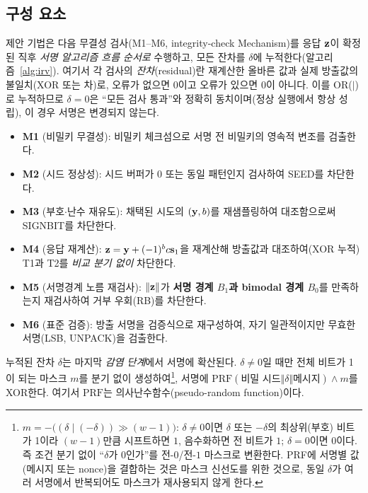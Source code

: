 \subsection{구성 요소}
제안 기법은 다음 무결성 검사(M1--M6, integrity-check Mechanism)를 응답 $\mathbf{z}$이 확정된 직후
\emph{서명 알고리즘 흐름 순서로} 수행하고, 모든 잔차를 $\delta$에 누적한다(알고리즘~\ref{alg:irv}). 여기서 각 검사의 \emph{잔차}(residual)란 재계산한 올바른 값과 실제 방출값의
불일치(XOR 또는 차)로, 오류가 없으면 $0$이고 오류가 있으면 $0$이 아니다. 이를 OR($\mathbin{|}$)로
누적하므로 $\delta=0$은 ``모든 검사 통과''와 정확히 동치이며(정상 실행에서 항상 성립), 이 경우
서명은 변경되지 않는다.
\begin{itemize}
  \item \textbf{M1} (비밀키 무결성): 비밀키 체크섬으로 서명 전 비밀키의 영속적 변조를 검출한다.
  \item \textbf{M2} (시드 정상성): 시드 버퍼가 0 또는 동일 패턴인지 검사하여 SEED를 차단한다.
  \item \textbf{M3} (부호$\cdot$난수 재유도): 채택된 시도의 $(\mathbf{y},b)$를 재샘플링하여 대조함으로써
        SIGNBIT를 차단한다.
  \item \textbf{M4} (응답 재계산): $\mathbf{z}=\mathbf{y}+(-1)^b c\mathbf{s}_1$을 재계산해 방출값과 대조하여(XOR 누적)
        T1과 T2를 \emph{비교 분기 없이} 차단한다.
  \item \textbf{M5} (서명경계 노름 재검사): $\lVert\mathbf{z}\rVert$가 \textbf{서명 경계 $B_1$과 bimodal 경계
        $B_0$}를 만족하는지 재검사하여 거부 우회(RB)를 차단한다.
  \item \textbf{M6} (표준 검증): 방출 서명을 검증식으로 재구성하여, 자기 일관적이지만 무효한
        서명(LSB, UNPACK)을 검출한다.
\end{itemize}
누적된 잔차 $\delta$는 마지막 \emph{감염 단계}에서 서명에 확산된다. $\delta\neq0$일 때만 전체 비트가 1이
되는 마스크 $m$를 분기 없이 생성하여\footnote{$m=-\big((\delta\mathbin{|}(-\delta))\gg(w{-}1)\big)$: $\delta\neq0$이면 $\delta$ 또는 $-\delta$의 최상위(부호) 비트가 1이라 $(w{-}1)$만큼 시프트하면 $1$, 음수화하면 전 비트가 $1$; $\delta=0$이면 $0$이다. 즉 조건 분기 없이 ``$\delta$가 0인가''를 전-$0$/전-$1$ 마스크로 변환한다. PRF에 서명별 값(메시지 또는 nonce)을 결합하는 것은 마스크 신선도를 위한 것으로, 동일 $\delta$가 여러 서명에서 반복되어도 마스크가 재사용되지 않게 한다.}, 서명에 $\mathrm{PRF}(\text{비밀 시드}\Vert\delta\Vert\text{메시지})\wedge m$를 XOR한다. 여기서 $\mathrm{PRF}$는 의사난수함수(pseudo-random function)이다.

